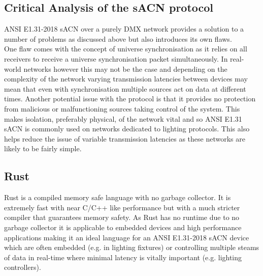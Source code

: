 \documentclass[11pt,a4paper]{report}
\begin{document}
	\subsection{Critical Analysis of the sACN protocol}
	ANSI E1.31-2018 sACN over a purely DMX network provides a solution to a number of problems as discussed above but also introduces its own flaws.\\		
	One flaw comes with the concept of universe synchronisation as it relies on all receivers to receive a universe synchronisation packet simultaneously. In real-world networks however this may not be the case and depending on the complexity of the network varying transmission latencies between devices may mean that even with synchronisation multiple sources act on data at different times. Another potential issue with the protocol is that it provides no protection from malicious or malfunctioning sources taking control of the system. This makes isolation, preferably physical, of the network vital and so ANSI E1.31 sACN is commonly used on networks dedicated to lighting protocols. This also helps reduce the issue of variable transmission latencies as these networks are likely to be fairly simple. 
	
	\subsection{Rust}
	Rust \cite{RUST_LANG} is a compiled memory safe language with no garbage collector. It is extremely fast with near C/C++ like performance \cite{RUST_C_COMPARISON} but with a much stricter compiler that guarantees memory safety. As Rust has no runtime due to no garbage collector it is applicable to embedded devices and high performance applications making it an ideal language for an ANSI E1.31-2018 sACN device which are often embedded (e.g. in lighting fixtures) or controlling multiple steams of data in real-time where minimal latency is vitally important (e.g. lighting controllers).
	
	
	
	
	
\end{document}
